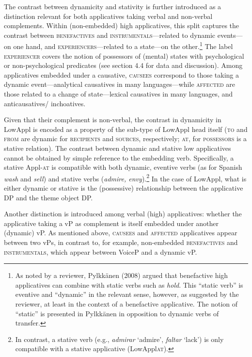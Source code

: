 \documentclass[12pt]{article}
\newenvironment{styleStandard}{\setlength\leftskip{0cm}\setlength\rightskip{0cm plus 1fil}\setlength\parindent{0cm}\setlength\parfillskip{0pt plus 1fil}\setlength\parskip{0in plus 1pt}\writerlistparindent\writerlistleftskip\leavevmode\normalfont\normalsize\writerlistlabel\ignorespaces}{\unskip\vspace{0.111in plus 0.0111in}\par}
\newcommand\writerlistleftskip{}
\newcommand\writerlistparindent{}
\newcommand\writerlistlabel{}
\begin{document}
\begin{styleStandard}
The contrast between dynamicity and stativity is further introduced as a distinction relevant for both applicatives taking verbal and non-verbal complements. Within (non-embedded) high applicatives, this split captures the contrast between \textsc{benefactives} and \textsc{instrumentals}—related to dynamic events—on one hand, and \textsc{experiencers}—related to a state—on the other.\footnote{ As noted by a reviewer, Pylkkänen (2008) argued that benefactive high applicatives can combine with static verbs such as \textit{hold}. This “static verb” is eventive and “dynamic” in the relevant sense, however, as suggested by the reviewer, at least in the context of a benefactive applicative. The notion of “static” is presented in Pylkkänen in opposition to dynamic verbs of transfer.} The label \textsc{experiencer} covers the notion of possessors of (mental) states with psychological or non-psychological predicates (see section 4.4 for data and discussion). Among applicatives embedded under a causative, \textsc{causees} correspond to those taking a dynamic event—analytical causatives in many languages—while \textsc{affected} are those related to a change of state—lexical causatives in many languages, and anticausatives/ inchoatives. 
\end{styleStandard}

\begin{styleStandard}
Given that their complement is non-verbal, the contrast in dynamicity in LowAppl is encoded as a property of the sub-type of LowAppl head itself (\textsc{to} and \textsc{from} are dynamic for \textsc{recipients} and \textsc{sources}, respectively; \textsc{at}, for \textsc{possessors} is a stative relation). The contrast between dynamic and stative low applicatives cannot be obtained by simple reference to the embedding verb. Specifically, a stative Appl-\textsc{at} is compatible with both dynamic, eventive verbs (as for Spanish \textit{wash} and \textit{sell}) and stative verbs (\textit{admire, envy}).\footnote{ In contrast, a stative verb (e.g., \textit{admirar} ‘admire’, \textit{faltar} ‘lack’) is only compatible with a stative applicative (LowAppl\textsc{at}). } In the case of LowAppl, what is either dynamic or stative is the (possessive) relationship between the applicative DP and the theme object DP. 
\end{styleStandard}

\begin{styleStandard}
Another distinction is introduced among verbal (high) applicatives: whether the applicative taking a vP as complement is itself embedded under another (dynamic) vP. As mentioned above, \textsc{causees} and \textsc{affected} applicatives appear between two vPs, in contrast to, for example, non-embedded \textsc{benefactives} and \textsc{instrumentals}, which appear between VoiceP and a dynamic vP. 
\end{styleStandard}
\end{document}
